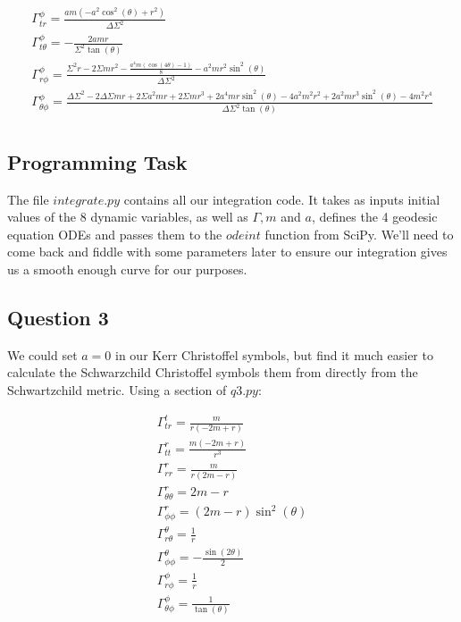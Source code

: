\documentclass[10pt,a4paper]{report}
\begin{document}
\begin{align*}
\Gamma^\phi_{tr} = \frac{a m \left(- a^{2} \cos^{2}{\left(\theta \right)} + r^{2}\right)}{\Delta \Sigma^{2}}\\
\Gamma^\phi_{t\theta} = - \frac{2 a m r}{\Sigma^{2} \tan{\left(\theta \right)}}\\
\Gamma^\phi_{r\phi} = \frac{\Sigma^{2} r - 2 \Sigma m r^{2} - \frac{a^{4} m \left(\cos{\left(4 \theta \right)} - 1\right)}{8} - a^{2} m r^{2} \sin^{2}{\left(\theta \right)}}{\Delta \Sigma^{2}}\\
\Gamma^\phi_{\theta\phi} = \frac{\Delta \Sigma^{2} - 2 \Delta \Sigma m r + 2 \Sigma a^{2} m r + 2 \Sigma m r^{3} + 2 a^{4} m r \sin^{2}{\left(\theta \right)} - 4 a^{2} m^{2} r^{2} + 2 a^{2} m r^{3} \sin^{2}{\left(\theta \right)} - 4 m^{2} r^{4}}{\Delta \Sigma^{2} \tan{\left(\theta \right)}}\\
\end{align*}

\normalsize

\subsection*{Programming Task}

The file $integrate.py$ contains all our integration code. It takes as inputs initial values of the 8 dynamic variables, as well as $\Gamma, m$ and $a$, defines the 4 geodesic equation ODEs and passes them to the $odeint$ function from SciPy. We'll need to come back and fiddle with some parameters later to ensure our integration gives us a smooth enough curve for our purposes. 
 
\subsection*{Question 3}

We could set $a=0$ in our Kerr Christoffel symbols, but find it much easier to calculate the Schwarzchild Christoffel symbols them from directly from the Schwartzchild metric. Using a section of $q3.py$:

\small\begin{align*}
\Gamma^t_{tr} = \frac{m}{r (- 2 m + r)}\\
\Gamma^r_{tt} = \frac{m (- 2 m + r)}{r^{3}}\\
\Gamma^r_{rr} = \frac{m}{r (2 m - r)}\\
\Gamma^r_{\theta\theta} = 2 m - r\\
\Gamma^r_{\phi\phi} = (2 m - r) \sin^{2}{(\theta )}\\
\Gamma^\theta_{r\theta} = \frac{1}{r}\\
\Gamma^\theta_{\phi\phi} = - \frac{\sin{(2 \theta )}}{2}\\
\Gamma^\phi_{r\phi} = \frac{1}{r}\\
\Gamma^\phi_{\theta\phi} = \frac{1}{\tan{(\theta )}}\\
\end{align*}
\end{document}
